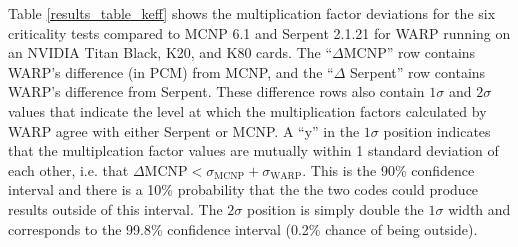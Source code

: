 \documentclass[preprint,12pt]{elsarticle}
\begin{document}
Table \ref{results_table_keff} shows the multiplication factor deviations for the six criticality tests compared to MCNP 6.1 and Serpent 2.1.21 for WARP running on an NVIDIA Titan Black, K20, and K80 cards.  The ``$\Delta$MCNP'' row contains WARP's difference (in PCM) from MCNP, and the ``$\Delta$ Serpent'' row contains WARP's difference from Serpent.  These difference rows also contain $1\sigma$ and $2\sigma$ values that indicate the level at which the multiplication factors calculated by WARP agree with either Serpent or MCNP.  A ``y'' in the $1\sigma$ position indicates that the multiplcation factor values are mutually within 1 standard deviation of each other, i.e. that $\Delta \textrm{MCNP}<\sigma_{\textrm{MCNP}}+\sigma_{\textrm{WARP}}$.  This is the 90\% confidence interval and there is a 10\% probability that the the two codes could produce results outside of this interval.  The $2\sigma$ position is simply double the $1\sigma$ width and corresponds to the 99.8\% confidence interval (0.2\% chance of being outside).
\end{document}
